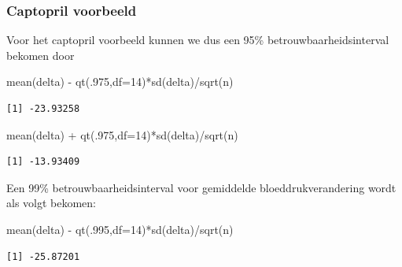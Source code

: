 \documentclass[
  dutch,
  letterpaper,
  12pt]{book}
\newenvironment{Shaded}{\begin{snugshade}}{\end{snugshade}}
\newcommand{\AttributeTok}[1]{\textcolor[rgb]{0.40,0.45,0.13}{#1}}
\newcommand{\DecValTok}[1]{\textcolor[rgb]{0.68,0.00,0.00}{#1}}
\newcommand{\FunctionTok}[1]{\textcolor[rgb]{0.28,0.35,0.67}{#1}}
\newcommand{\NormalTok}[1]{\textcolor[rgb]{0.00,0.23,0.31}{#1}}
\newcommand{\SpecialCharTok}[1]{\textcolor[rgb]{0.37,0.37,0.37}{#1}}
\theoremstyle{definition}
\theoremstyle{definition}
\theoremstyle{definition}
\theoremstyle{remark}
\begin{document}
\subsubsection{Captopril voorbeeld}\label{captopril-voorbeeld-1}

Voor het captopril voorbeeld kunnen we dus een 95\%
betrouwbaarheidsinterval bekomen door

\begin{Shaded}
\begin{Highlighting}[]
\FunctionTok{mean}\NormalTok{(delta) }\SpecialCharTok{{-}}  \FunctionTok{qt}\NormalTok{(.}\DecValTok{975}\NormalTok{,}\AttributeTok{df=}\DecValTok{14}\NormalTok{)}\SpecialCharTok{*}\FunctionTok{sd}\NormalTok{(delta)}\SpecialCharTok{/}\FunctionTok{sqrt}\NormalTok{(n)}
\end{Highlighting}
\end{Shaded}

\begin{verbatim}
[1] -23.93258
\end{verbatim}

\begin{Shaded}
\begin{Highlighting}[]
\FunctionTok{mean}\NormalTok{(delta) }\SpecialCharTok{+} \FunctionTok{qt}\NormalTok{(.}\DecValTok{975}\NormalTok{,}\AttributeTok{df=}\DecValTok{14}\NormalTok{)}\SpecialCharTok{*}\FunctionTok{sd}\NormalTok{(delta)}\SpecialCharTok{/}\FunctionTok{sqrt}\NormalTok{(n)}
\end{Highlighting}
\end{Shaded}

\begin{verbatim}
[1] -13.93409
\end{verbatim}

Een 99\% betrouwbaarheidsinterval voor gemiddelde bloeddrukverandering
wordt als volgt bekomen:

\begin{Shaded}
\begin{Highlighting}[]
\FunctionTok{mean}\NormalTok{(delta) }\SpecialCharTok{{-}}  \FunctionTok{qt}\NormalTok{(.}\DecValTok{995}\NormalTok{,}\AttributeTok{df=}\DecValTok{14}\NormalTok{)}\SpecialCharTok{*}\FunctionTok{sd}\NormalTok{(delta)}\SpecialCharTok{/}\FunctionTok{sqrt}\NormalTok{(n)}
\end{Highlighting}
\end{Shaded}

\begin{verbatim}
[1] -25.87201
\end{verbatim}
\end{document}
